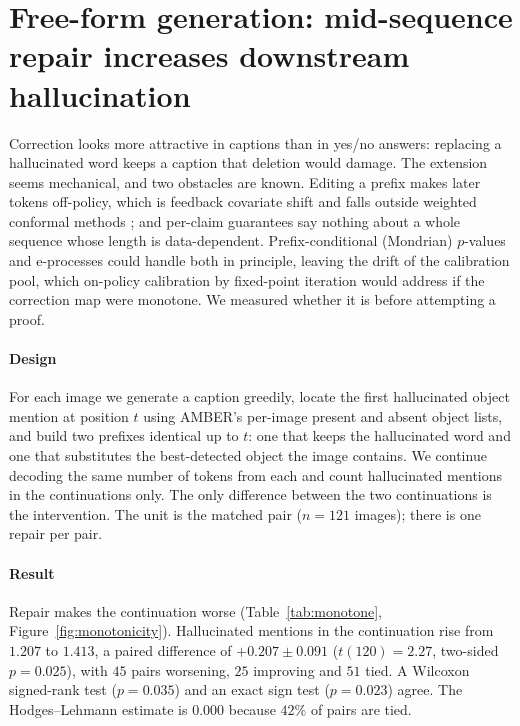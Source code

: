\section{Free-form generation: mid-sequence repair increases downstream hallucination}
\label{sec:sequential}

Correction looks more attractive in captions than in yes/no answers: replacing a hallucinated word keeps a
caption that deletion would damage. The extension seems mechanical, and two obstacles are known. Editing a prefix makes
later tokens off-policy, which is feedback covariate shift \citep{fannjiang2022fcs} and falls outside weighted conformal
methods \citep{tibshirani2019}; and per-claim guarantees say nothing about a whole sequence whose length is
data-dependent. Prefix-conditional (Mondrian) $p$-values and e-processes \citep{waudbysmith2024,ramdas2023} could
handle both in principle, leaving the drift of the calibration pool, which on-policy calibration by fixed-point
iteration would address if the correction map were monotone. We measured whether it is before attempting a proof.

\paragraph{Design}
For each image we generate a caption greedily, locate the first hallucinated object mention at position $t$ using AMBER's
per-image present and absent object lists, and build two prefixes identical up to $t$: one that keeps the hallucinated
word and one that substitutes the best-detected object the image contains. We continue decoding the same number of
tokens from each and count hallucinated mentions in the continuations only. The only difference between the two
continuations is the intervention. The unit is the matched pair ($n=121$ images); there is one repair per pair.

\paragraph{Result}
Repair makes the continuation worse (Table~\ref{tab:monotone}, Figure~\ref{fig:monotonicity}). Hallucinated mentions
in the continuation rise from $1.207$ to $1.413$, a paired difference of $+0.207\pm0.091$ ($t(120)=2.27$, two-sided
$p=0.025$), with $45$ pairs worsening, $25$ improving and $51$ tied. A Wilcoxon signed-rank test ($p=0.035$) and an exact sign test
($p=0.023$) agree. The Hodges--Lehmann estimate is $0.000$ because $42\%$ of pairs are tied.

